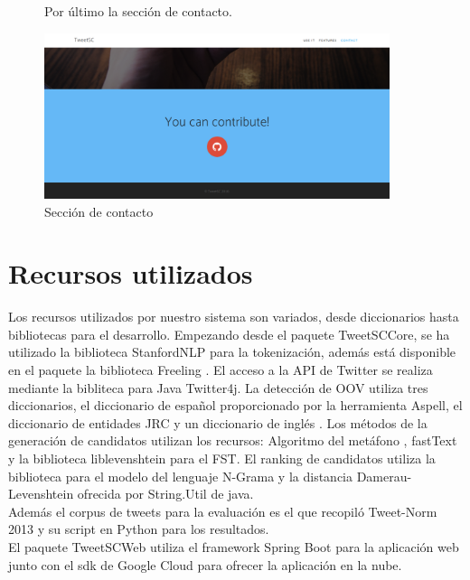 \documentclass[spanish,12pt, a4paper,twoside]{paper}
\let\oldsection\section
\def\section{\cleardoublepage\oldsection}
\begin{document}
\begin{figure}[h]
Por último la sección de contacto.
\begin{center}
 \includegraphics[width=0.9\textwidth]{recursos/WebContact}
\caption{Sección de contacto}
\label{fig:webcontact}
\end{center}
\end{figure}

\section{Recursos utilizados}\label{sec:recursosutilizados}
Los recursos utilizados por nuestro sistema son variados, desde diccionarios hasta bibliotecas para el desarrollo. Empezando desde el paquete TweetSCCore, se ha utilizado la biblioteca StanfordNLP \cite{stanfordnlp} para la tokenización, además está disponible en el paquete la biblioteca Freeling \cite{freeling}. El acceso a la API de Twitter se realiza mediante la bibliteca para Java Twitter4j. La detección de OOV utiliza tres diccionarios, el diccionario de español proporcionado por la herramienta Aspell, el diccionario de entidades JRC y un diccionario de inglés \cite{englishdictionary}. Los métodos de la generación de candidatos utilizan los recursos: Algoritmo del metáfono \cite{mosquera:2011}, fastText \cite{facebook:fasttext} y la biblioteca liblevenshtein \cite{liblevenshtein} para el FST. El ranking de candidatos utiliza la biblioteca \cite{opennlp} para el modelo del lenguaje N-Grama y la distancia Damerau-Levenshtein ofrecida por String.Util de java.\\

Además el corpus de tweets para la evaluación es el que recopiló Tweet-Norm 2013 \cite{alegria:2013} y su script en Python para los resultados.\\

El paquete TweetSCWeb utiliza el framework Spring Boot para la aplicación web junto con el sdk de Google Cloud para ofrecer la aplicación en la nube.
\end{document}
